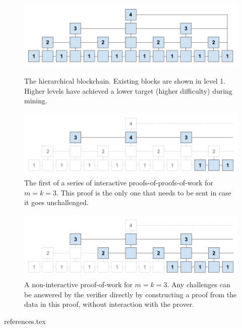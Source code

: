 \documentclass[11pt]{llncs}
\begin{document}
\begin{figure}[h]
    \caption{The hierarchical blockchain. Existing blocks are shown in level 1.
    Higher levels have achieved a lower target (higher difficulty) during mining.}
    \centering
    \includegraphics[width=\textwidth,keepaspectratio]{figures/hierarchical-ledger.png}
    \label{fig:hierarchy}
\end{figure}

\begin{figure}[h]
    \caption{The first of a series of interactive proofs-of-proofs-of-work for
    $m = k = 3$. This proof is the only one that needs to be sent in case it
    goes unchallenged.}
    \centering
    \includegraphics[width=\textwidth,keepaspectratio]{figures/interactive-popow.png}
\end{figure}

\begin{figure}[h]
    \caption{A non-interactive proof-of-work for $m = k = 3$. Any challenges
    can be answered by the verifier directly by constructing a proof from the
    data in this proof, without interaction with the prover.}
    \centering
    \includegraphics[width=\textwidth,keepaspectratio]{figures/non-interactive-popow.png}
\end{figure}

{references.tex}
\end{document}
